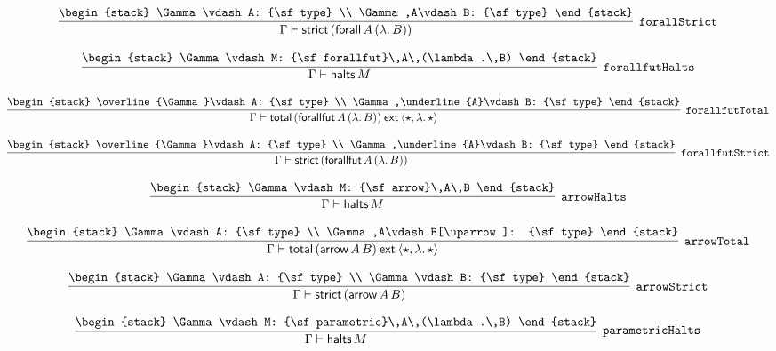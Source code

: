 \[
\infer[{\tt forallStrict}]{\Gamma \vdash {\sf strict}\,({\sf forall}\,A\,(\lambda .\,B))}{
\begin{stack}
\Gamma \vdash A: {\sf type}
\\
\Gamma ,A\vdash B: {\sf type}
\end{stack}}
\]

\[
\infer[{\tt forallfutHalts}]{\Gamma \vdash {\sf halts}\,M}{
\begin{stack}
\Gamma \vdash M: {\sf forallfut}\,A\,(\lambda .\,B)
\end{stack}}
\]

\[
\infer[{\tt forallfutTotal}]{\Gamma \vdash {\sf total}\,({\sf forallfut}\,A\,(\lambda .\,B))\:{\sf ext}\:\langle \star ,\lambda .\,\star \rangle }{
\begin{stack}
\overline{\Gamma}\vdash A: {\sf type}
\\
\Gamma ,\underline{A}\vdash B: {\sf type}
\end{stack}}
\]

\[
\infer[{\tt forallfutStrict}]{\Gamma \vdash {\sf strict}\,({\sf forallfut}\,A\,(\lambda .\,B))}{
\begin{stack}
\overline{\Gamma}\vdash A: {\sf type}
\\
\Gamma ,\underline{A}\vdash B: {\sf type}
\end{stack}}
\]

\[
\infer[{\tt arrowHalts}]{\Gamma \vdash {\sf halts}\,M}{
\begin{stack}
\Gamma \vdash M: {\sf arrow}\,A\,B
\end{stack}}
\]

\[
\infer[{\tt arrowTotal}]{\Gamma \vdash {\sf total}\,({\sf arrow}\,A\,B)\:{\sf ext}\:\langle \star ,\lambda .\,\star \rangle }{
\begin{stack}
\Gamma \vdash A: {\sf type}
\\
\Gamma ,A\vdash B[\uparrow ]: {\sf type}
\end{stack}}
\]

\[
\infer[{\tt arrowStrict}]{\Gamma \vdash {\sf strict}\,({\sf arrow}\,A\,B)}{
\begin{stack}
\Gamma \vdash A: {\sf type}
\\
\Gamma \vdash B: {\sf type}
\end{stack}}
\]

\[
\infer[{\tt parametricHalts}]{\Gamma \vdash {\sf halts}\,M}{
\begin{stack}
\Gamma \vdash M: {\sf parametric}\,A\,(\lambda .\,B)
\end{stack}}
\]

